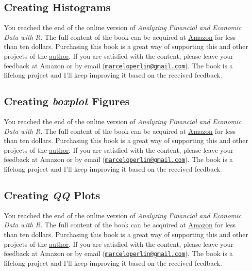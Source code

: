 \documentclass[
  12pt,
]{book}
\newenvironment{pleasebuyit}
{\begin{noteblock}
		
	} {\end{noteblock}}
\begin{document}
\hypertarget{creating-histograms}{%
\subsection{Creating Histograms}\label{creating-histograms}}

\begin{pleasebuyit}
You reached the end of the online version of \emph{Analyzing Financial
and Economic Data with R}. The full content of the book can be acquired
at \href{https://www.amazon.com/dp/B084LSNXMN}{Amazon} for less than ten
dollars. Purchasing this book is a great way of supporting this and
other projects of the \href{https://www.msperlin.com/blog/}{author}. If
you are satisfied with the content, please leave your feedback at Amazon
or by email
(\href{mailto:marceloperlin@gmail.com}{\nolinkurl{marceloperlin@gmail.com}}).
The book is a lifelong project and I'll keep improving it based on the
received feedback.
\end{pleasebuyit}

\hypertarget{creating-boxplot-figures}{%
\subsection{\texorpdfstring{Creating \emph{boxplot} Figures}{Creating boxplot Figures}}\label{creating-boxplot-figures}}

\begin{pleasebuyit}
You reached the end of the online version of \emph{Analyzing Financial
and Economic Data with R}. The full content of the book can be acquired
at \href{https://www.amazon.com/dp/B084LSNXMN}{Amazon} for less than ten
dollars. Purchasing this book is a great way of supporting this and
other projects of the \href{https://www.msperlin.com/blog/}{author}. If
you are satisfied with the content, please leave your feedback at Amazon
or by email
(\href{mailto:marceloperlin@gmail.com}{\nolinkurl{marceloperlin@gmail.com}}).
The book is a lifelong project and I'll keep improving it based on the
received feedback.
\end{pleasebuyit}

\hypertarget{creating-qq-plots}{%
\subsection{\texorpdfstring{Creating \emph{QQ} Plots}{Creating QQ Plots}}\label{creating-qq-plots}}

\begin{pleasebuyit}
You reached the end of the online version of \emph{Analyzing Financial
and Economic Data with R}. The full content of the book can be acquired
at \href{https://www.amazon.com/dp/B084LSNXMN}{Amazon} for less than ten
dollars. Purchasing this book is a great way of supporting this and
other projects of the \href{https://www.msperlin.com/blog/}{author}. If
you are satisfied with the content, please leave your feedback at Amazon
or by email
(\href{mailto:marceloperlin@gmail.com}{\nolinkurl{marceloperlin@gmail.com}}).
The book is a lifelong project and I'll keep improving it based on the
received feedback.
\end{pleasebuyit}
\end{document}
